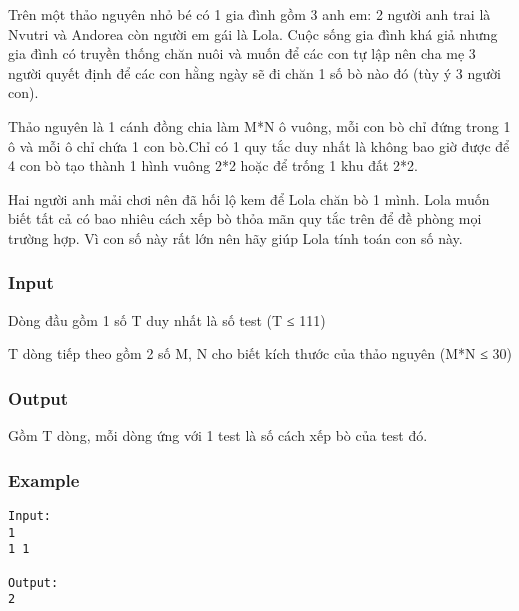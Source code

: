 



   Trên một thảo nguyên nhỏ bé có 1 gia đình gồm 3 anh em: 2 người anh trai là Nvutri và Andorea còn người em gái là Lola. Cuộc sống gia đình khá giả nhưng gia đình có truyền thống chăn nuôi và muốn để các con tự lập nên cha mẹ 3 người quyết định để các con hằng ngày sẽ đi chăn 1 số bò nào đó (tùy ý 3 người con).  

   Thảo nguyên là 1 cánh đồng chia làm M*N ô vuông, mỗi con bò chỉ đứng trong 1 ô và mỗi ô chỉ chứa 1 con bò.Chỉ có 1 quy tắc duy nhất là không bao giờ được để 4 con bò tạo thành 1 hình vuông 2*2 hoặc để trống 1 khu đất 2*2.  

   Hai người anh mải chơi nên đã hối lộ kem để Lola chăn bò 1 mình. Lola muốn biết tất cả có bao nhiêu cách xếp bò thỏa mãn quy tắc trên để đề phòng mọi trường hợp. Vì con số này rất lớn nên hãy giúp Lola tính toán con số này.  

\subsubsection{   Input  }

   Dòng đầu gồm 1 số T duy nhất là số test (T ≤ 111)  

   T dòng tiếp theo gồm 2 số M, N cho biết kích thước của thảo nguyên (M*N ≤ 30)  

\subsubsection{   Output  }

   Gồm T dòng, mỗi dòng ứng với 1 test là số cách xếp bò của test đó.  

\subsubsection{   Example  }
\begin{verbatim}
Input:
1
1 1

Output:
2
\end{verbatim}